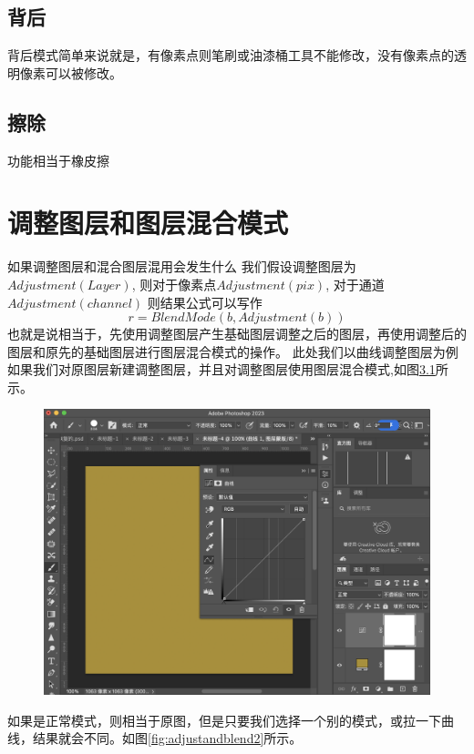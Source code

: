 \section{ 背后}
背后模式简单来说就是，有像素点则笔刷或油漆桶工具不能修改，没有像素点的透明像素可以被修改。
\section{ 擦除}
功能相当于橡皮擦
\newpage 
\chapter{调整图层和图层混合模式}
如果调整图层和混合图层混用会发生什么
我们假设调整图层为$Adjustment(Layer)$,
则对于像素点$Adjustment(pix)$,
对于通道$Adjustment(channel)$
则结果公式可以写作
$$r=BlendMode(b,Adjustment(b))$$
也就是说相当于，先使用调整图层产生基础图层调整之后的图层，再使用调整后的图层和原先的基础图层进行图层混合模式的操作。
此处我们以曲线调整图层为例
如果我们对原图层新建调整图层，并且对调整图层使用图层混合模式,如图\ref{fig:adjustandblend1}所示。
\begin{figure}[h!]
	\centering
	\includegraphics[width=\linewidth]{figure/adjustandblend1}
	\caption{}
	\label{fig:adjustandblend1}
\end{figure}
\newpage 
如果是正常模式，则相当于原图，但是只要我们选择一个别的模式，或拉一下曲线，结果就会不同。如图\ref{fig:adjustandblend2}所示。
